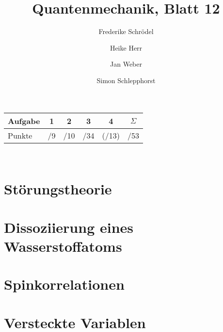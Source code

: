 \documentclass[11pt, ngerman, fleqn, DIV=15, headinclude]{scrartcl}
\title{Quantenmechanik, Blatt 12}
\author{
    Frederike Schrödel \and Heike Herr \and Jan Weber \and Simon Schlepphorst
}
\begin{document}
\maketitle
\begin{center}
	\begin{tabular}{l|c|c|c|c|c}
		Aufgabe &1&2&3&4&$\Sigma$\\
		\hline
		Punkte &\quad /9 & \quad /10 & \quad /34 &(\quad /13) & \quad
		/53
	\end{tabular}\\
\end{center}

\section{Störungstheorie}

\section{Dissoziierung eines Wasserstoffatoms}

\section{Spinkorrelationen}

\section{Versteckte Variablen}
\end{document}
